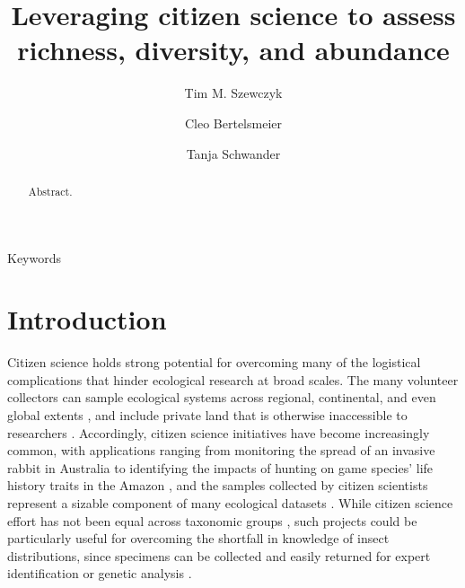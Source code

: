 \documentclass[preprint,final,times,12pt,3p]{elsarticle}
\begin{document}
\begin{frontmatter}

\title{Leveraging citizen science to assess richness, diversity, and abundance}

\author[DEE]{Tim M. Szewczyk}
\author[DEE]{Cleo Bertelsmeier}
\author[DEE]{Tanja Schwander}

\address[DEE]{Department of Ecology and Evolution, University of Lausanne}


\begin{abstract}
Abstract.
\end{abstract}

\begin{keyword}
Keywords
\end{keyword}

\end{frontmatter}
\linenumbers



\section{Introduction}
\label{S:1}

Citizen science holds strong potential for overcoming many of the logistical complications that hinder ecological research at broad scales. The many volunteer collectors can sample ecological systems across regional, continental, and even global extents \citep{Theobald2015}, and include private land that is otherwise inaccessible to researchers \citep{Pernat2020}. Accordingly, citizen science initiatives have become increasingly common, with applications ranging from monitoring the spread of an invasive rabbit in Australia \citep{Roy-Dufresne2019} to identifying the impacts of hunting on game species' life history traits in the Amazon \citep{ElBizri2020}, and the samples collected by citizen scientists represent a sizable component of many ecological datasets \citep{Poisson2020}.  While citizen science effort has not been equal across taxonomic groups \citep{Theobald2015,Troudet2017}, such projects could be particularly useful for overcoming the shortfall in knowledge of insect distributions, since specimens can be collected and easily returned for expert identification or genetic analysis \citep{Pernat2020}.
\end{document}

